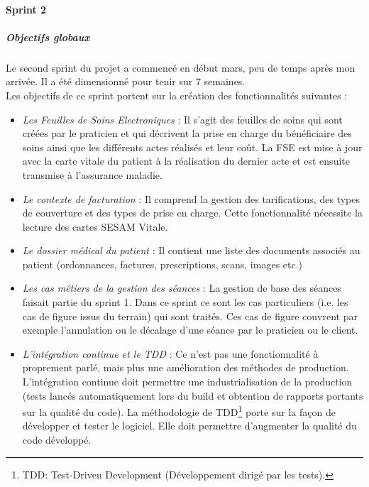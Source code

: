 \paragraph*{Sprint 2}
\subparagraph{Objectifs globaux}
Le second sprint du projet a commencé en début mars, peu de temps après mon arrivée. Il a été dimensionné pour tenir sur 7 semaines.\\
Les objectifs de ce sprint portent sur la création des fonctionnalités suivantes : 
\begin{itemize}
	\item \textit{Les Feuilles de Soins Electroniques} : Il s'agit des feuilles de soins qui sont créées par le praticien et qui décrivent la prise en charge du bénéficiaire des soins ainsi que les différents actes réalisés et leur coût. La \gls{FSE} est mise à jour avec la carte vitale du patient à la réalisation du dernier acte et est ensuite transmise à l'assurance maladie.
	\item \textit{Le contexte de facturation} : Il comprend la gestion des tarifications, des types de couverture et des types de prise en charge. Cette fonctionnalité nécessite la lecture des cartes SESAM Vitale.
	\item \textit{Le dossier médical du patient} : Il contient une liste des documents associés au patient (ordonnances, factures, prescriptions, scans, images etc.)
	\item \textit{Les cas métiers de la gestion des séances} : La gestion de base des séances faisait partie du sprint 1. Dans ce sprint ce sont les cas particuliers (i.e. les cas de figure issus du terrain) qui sont traités. Ces cas de figure couvrent par exemple l'annulation ou le décalage d'une séance par le praticien ou le client.
	\item \textit{L'intégration continue et le TDD} : Ce n'est pas une fonctionnalité à proprement parlé, mais plus une amélioration des méthodes de production. L'intégration continue doit permettre une industrialisation de la production (tests lancés automatiquement lors du build et obtention de rapports portants sur la qualité du code). La méthodologie de TDD\footnote{TDD: Test-Driven Development (Développement dirigé par les tests).} porte sur la façon de développer et tester le logiciel. Elle doit permettre d'augmenter la qualité du code développé.
\end{itemize}

